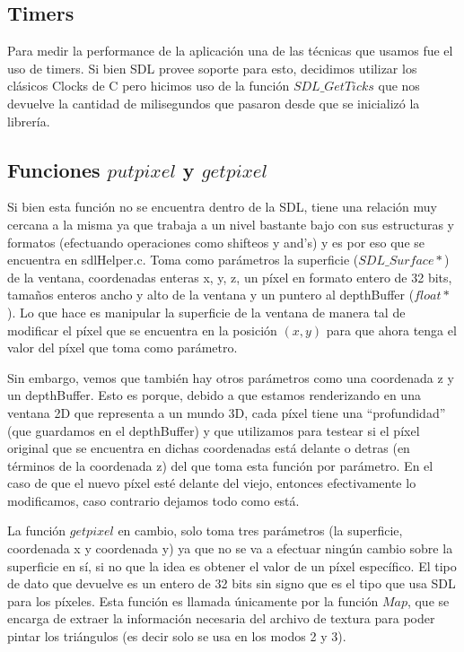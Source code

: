 \documentclass[a4paper]{article}
\begin{document}
\subsection{Timers}
Para medir la performance de la aplicación una de las técnicas que usamos fue el uso de timers. Si bien SDL provee soporte para esto, decidimos utilizar los clásicos Clocks de C pero hicimos uso de la función $SDL\_GetTicks$ que nos devuelve la cantidad de milisegundos que pasaron desde que se inicializó la librería.

\subsection{Funciones $putpixel$ y $getpixel$} \label{putpixel}
Si bien esta función no se encuentra dentro de la SDL, tiene una relación muy cercana a la misma ya que trabaja a un nivel bastante bajo con sus estructuras y formatos (efectuando operaciones como shifteos y and's) y es por eso que se encuentra en sdlHelper.c.
Toma como parámetros la superficie ($SDL\_Surface*$) de la ventana, coordenadas enteras x, y, z, un píxel en formato entero de 32 bits, tamaños enteros ancho y alto de la ventana y un puntero al depthBuffer ($float*$). Lo que hace es manipular la superficie de la ventana de manera tal de modificar el píxel que se encuentra en la posición $(x, y)$ para que ahora tenga el valor del píxel que toma como parámetro. 
\par Sin embargo, vemos que también hay otros parámetros como una coordenada z y un depthBuffer. Esto es porque, debido a que estamos renderizando en una ventana 2D que representa a un mundo 3D, cada píxel tiene una ``profundidad'' (que guardamos en el depthBuffer) y que utilizamos para testear si el píxel original que se encuentra en dichas coordenadas está delante o detras (en términos de la coordenada z) del que toma esta función por parámetro.
En el caso de que el nuevo píxel esté delante del viejo, entonces efectivamente lo modificamos, caso contrario dejamos
 todo como está.
 
 
La función $getpixel$ en cambio, solo toma tres parámetros (la superficie, coordenada x y coordenada y) ya que no se va a efectuar ningún cambio sobre la superficie en sí, si no que la idea es obtener el valor de un píxel específico. El tipo de dato que devuelve es un entero de 32 bits sin signo que es el tipo que usa SDL para los píxeles. Esta función es llamada únicamente por la función $Map$, que se encarga de extraer la información necesaria del archivo de textura para poder pintar los triángulos (es decir solo se usa en los modos 2 y 3).
 
\end{document}
